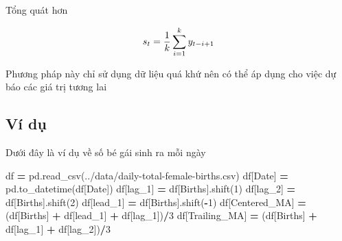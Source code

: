 \documentclass[
]{book}
\newenvironment{Shaded}{\begin{snugshade}}{\end{snugshade}}
\newcommand{\DecValTok}[1]{\textcolor[rgb]{0.00,0.00,0.81}{#1}}
\newcommand{\NormalTok}[1]{#1}
\newcommand{\OperatorTok}[1]{\textcolor[rgb]{0.81,0.36,0.00}{\textbf{#1}}}
\newcommand{\StringTok}[1]{\textcolor[rgb]{0.31,0.60,0.02}{#1}}
\begin{document}
Tổng quát hơn

\[\begin{align}
\Large s_{t} = \frac{1}{k} \sum^{k}_{i=1}{y_{t-i+1}}
\end{align}\]

Phương pháp này chỉ sử dụng dữ liệu quá khứ nên có thể áp dụng cho việc dự báo các giá trị tương lai

\subsection{Ví dụ}\label{vuxed-dux1ee5}

Dưới đây là ví dụ về số bé gái sinh ra mỗi ngày

\begin{Shaded}
\begin{Highlighting}[]
\NormalTok{df }\OperatorTok{=}\NormalTok{ pd.read\_csv(}\StringTok{\textquotesingle{}../data/daily{-}total{-}female{-}births.csv\textquotesingle{}}\NormalTok{)}
\NormalTok{df[}\StringTok{\textquotesingle{}Date\textquotesingle{}}\NormalTok{] }\OperatorTok{=}\NormalTok{ pd.to\_datetime(df[}\StringTok{\textquotesingle{}Date\textquotesingle{}}\NormalTok{])}
\NormalTok{df[}\StringTok{\textquotesingle{}lag\_1\textquotesingle{}}\NormalTok{] }\OperatorTok{=}\NormalTok{ df[}\StringTok{\textquotesingle{}Births\textquotesingle{}}\NormalTok{].shift(}\DecValTok{1}\NormalTok{)}
\NormalTok{df[}\StringTok{\textquotesingle{}lag\_2\textquotesingle{}}\NormalTok{] }\OperatorTok{=}\NormalTok{ df[}\StringTok{\textquotesingle{}Births\textquotesingle{}}\NormalTok{].shift(}\DecValTok{2}\NormalTok{)}
\NormalTok{df[}\StringTok{\textquotesingle{}lead\_1\textquotesingle{}}\NormalTok{] }\OperatorTok{=}\NormalTok{ df[}\StringTok{\textquotesingle{}Births\textquotesingle{}}\NormalTok{].shift(}\OperatorTok{{-}}\DecValTok{1}\NormalTok{)}
\NormalTok{df[}\StringTok{\textquotesingle{}Centered\_MA\textquotesingle{}}\NormalTok{] }\OperatorTok{=}\NormalTok{ (df[}\StringTok{\textquotesingle{}Births\textquotesingle{}}\NormalTok{] }\OperatorTok{+}\NormalTok{ df[}\StringTok{\textquotesingle{}lead\_1\textquotesingle{}}\NormalTok{] }\OperatorTok{+}\NormalTok{ df[}\StringTok{\textquotesingle{}lag\_1\textquotesingle{}}\NormalTok{])}\OperatorTok{/}\DecValTok{3}
\NormalTok{df[}\StringTok{\textquotesingle{}Trailing\_MA\textquotesingle{}}\NormalTok{] }\OperatorTok{=}\NormalTok{ (df[}\StringTok{\textquotesingle{}Births\textquotesingle{}}\NormalTok{] }\OperatorTok{+}\NormalTok{ df[}\StringTok{\textquotesingle{}lag\_1\textquotesingle{}}\NormalTok{] }\OperatorTok{+}\NormalTok{ df[}\StringTok{\textquotesingle{}lag\_2\textquotesingle{}}\NormalTok{])}\OperatorTok{/}\DecValTok{3}
\end{Highlighting}
\end{Shaded}
\end{document}
